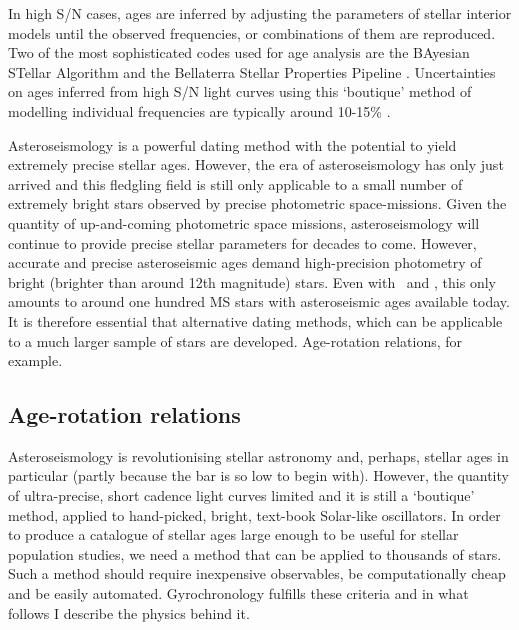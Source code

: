 In high S/N cases, ages are inferred by adjusting the parameters of stellar
interior models \citep[\eg][]{Kjeldsen2008} until the observed frequencies, or
combinations of them are reproduced.
Two of the most sophisticated codes used for age analysis are the BAyesian
STellar Algorithm \citep[BASTA][]{Silva-aguirre2015} and the Bellaterra
Stellar Properties Pipeline \citep{Serenelli2013}.
Uncertainties on ages inferred from high S/N light curves using this
`boutique' method of modelling individual frequencies are typically around
10-15\% \citep{Silva-aguirre2015a}.

Asteroseismology is a powerful dating method with the potential to yield
extremely precise stellar ages.
However, the era of asteroseismology has only just arrived and this fledgling
field is still only applicable to a small number of extremely bright stars
observed by precise photometric space-missions.
Given the quantity of up-and-coming photometric space missions,
asteroseismology will continue to provide precise stellar parameters for
decades to come.
However, accurate and precise asteroseismic ages demand high-precision
photometry of bright (brighter than around 12th magnitude) stars.
Even with \kepler\ and \corot, this only amounts to around one hundred MS
stars with asteroseismic ages available today.
It is therefore essential that alternative dating methods, which can be
applicable to a much larger sample of stars are developed.
Age-rotation relations, for example.

\subsection{Age-rotation relations}

Asteroseismology is revolutionising stellar astronomy and, perhaps, stellar
ages in particular (partly because the bar is so low to begin with).
However, the quantity of ultra-precise, short cadence light curves limited and
it is still a `boutique' method, applied to hand-picked, bright, text-book
Solar-like oscillators.
In order to produce a catalogue of stellar ages large enough to be useful for
stellar population studies, we need a method that can be applied to thousands
of stars.
Such a method should require inexpensive observables, be computationally cheap
and be easily automated.
Gyrochronology fulfills these criteria and in what follows I describe the
physics behind it.

